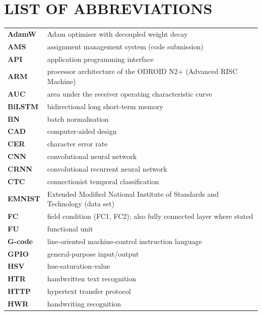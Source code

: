 
\section*{LIST OF ABBREVIATIONS}

\begingroup
\fontsize{10}{12}\selectfont
\begin{longtable}{p{3cm}p{11cm}}
  \textbf{AdamW} & Adam optimiser with decoupled weight decay \\
  \textbf{AMS} & assignment management system (code submission) \\
  \textbf{API} & application programming interface \\
  \textbf{ARM} & processor architecture of the ODROID N2+ (Advanced RISC Machine) \\
  \textbf{AUC} & area under the receiver operating characteristic curve \\
  \textbf{BiLSTM} & bidirectional long short-term memory \\
  \textbf{BN} & batch normalisation \\
  \textbf{CAD} & computer-aided design \\
  \textbf{CER} & character error rate \\
  \textbf{CNN} & convolutional neural network \\
  \textbf{CRNN} & convolutional recurrent neural network \\
  \textbf{CTC} & connectionist temporal classification \\
  \textbf{EMNIST} & Extended Modified National Institute of Standards and Technology (data set) \\
  \textbf{FC} & field condition (FC1, FC2); also fully connected layer where stated \\
  \textbf{FU} & functional unit \\
  \textbf{G-code} & line-oriented machine-control instruction language \\
  \textbf{GPIO} & general-purpose input/output \\
  \textbf{HSV} & hue-saturation-value \\
  \textbf{HTR} & handwritten text recognition \\
  \textbf{HTTP} & hypertext transfer protocol \\
  \textbf{HWR} & handwriting recognition \\

\end{longtable}

